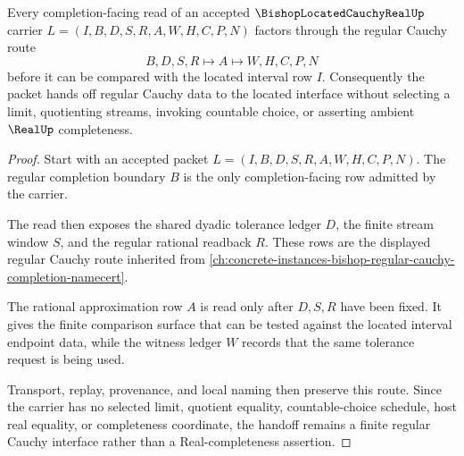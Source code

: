 \begin{theorem}
\label{thm:bishop-located-cauchy-real-regular-cauchy-handoff}
Every completion-facing read of an accepted $\BishopLocatedCauchyRealUp$ carrier $L=(I,B,D,S,R,A,W,H,C,P,N)$ factors through the regular Cauchy route
$$
B,D,S,R \longmapsto A \longmapsto W,H,C,P,N
$$
before it can be compared with the located interval row $I$. Consequently the packet hands off regular Cauchy data to the located interface without selecting a limit, quotienting streams, invoking countable choice, or asserting ambient $\RealUp$ completeness.
\end{theorem}
\begin{proof}
Start with an accepted packet $L=(I,B,D,S,R,A,W,H,C,P,N)$. The regular completion boundary $B$ is the only completion-facing row admitted by the carrier.

The read then exposes the shared dyadic tolerance ledger $D$, the finite stream window $S$, and the regular rational readback $R$. These rows are the displayed regular Cauchy route inherited from \autoref{ch:concrete-instances-bishop-regular-cauchy-completion-namecert}.

The rational approximation row $A$ is read only after $D,S,R$ have been fixed. It gives the finite comparison surface that can be tested against the located interval endpoint data, while the witness ledger $W$ records that the same tolerance request is being used.

Transport, replay, provenance, and local naming then preserve this route. Since the carrier has no selected limit, quotient equality, countable-choice schedule, host real equality, or completeness coordinate, the handoff remains a finite regular Cauchy interface rather than a Real-completeness assertion.
\end{proof}

